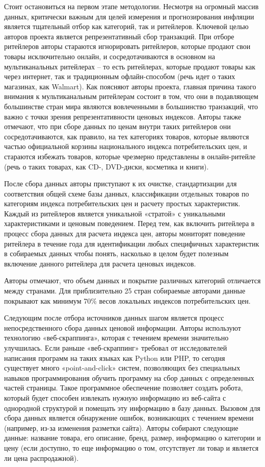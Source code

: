 Стоит остановиться на первом этапе методологии. Несмотря на огромный массив данных, критически важным для целей измерения и прогнозирования инфляции является тщательный отбор как категорий, так и ритейлеров. Ключевой целью авторов проекта является репрезентативный сбор транзакций. При отборе ритейлеров авторы стараются игнорировать ритейлеров, которые продают свои товары исключительно онлайн, и сосредотачиваются в основном на мультиканальных ритейлерах – то есть ритейлерах, которые продают товары как через интернет, так и традиционным офлайн-способом (речь идет о таких магазинах, как Walmart). Как поясняют авторы проекта, главная причина такого внимания к мультиканальным ритейлерам состоит в том, что они в подавляющем большинстве стран мира являются вовлеченными в большинство транзакций, что важно с точки зрения репрезентативности ценовых индексов. Авторы также отмечают, что при сборе данных по ценам внутри таких ритейлеров они сосредотачиваются, как правило, на тех категориях товаров, которые являются частью официальной корзины национального индекса потребительских цен, и стараются избежать товаров, которые чрезмерно представлены в онлайн-ритейле (речь о таких товарах, как CD-, DVD-диски, косметика и книги).

После сбора данных авторы приступают к их очистке, стандартизации для соответствия общей схеме базы данных, классификации отдельных товаров по категориям индекса потребительских цен и расчету простых характеристик. Каждый из ритейлеров является уникальной «стратой» с уникальными характеристиками и ценовым поведением. Перед тем, как включить ритейлера в процесс сбора данных для расчета индекса цен, авторы мониторят поведение ритейлера в течение года для идентификации любых специфичных характеристик в собираемых данных чтобы понять, насколько в целом будет полезным включение данного ритейлера для расчета ценовых индексов.

Авторы отмечают, что объем данных и покрытие различных категорий отличается между странами. Для приблизительно 25 стран собираемые авторами данные покрывают как минимум 70\% весов локальных индексов потребительских цен.

Следующим после отбора источников данных шагом является процесс непосредственного сбора данных ценовой информации. Авторы используют технологию «веб-скраппинга», которая с течением времени значительно улучшилась. Если раньше «веб-скраппинг» требовал от исследователей написания программ на таких языках как Python или PHP, то сегодня существует много «point-and-click» систем, позволяющих без специальных навыков программирования обучить программу на сбор данных с определенных частей страницы. Такое программное обеспечение позволяет создать робота, который будет способен извлекать нужную информацию из веб-сайта с однородной структурой и помещать эту информацию в базу данных. Вызовом для сбора данных является обнаружение ошибок, возникающих с течением времени (например, из-за изменения разметки сайта). Авторы собирают следующие данные: название товара, его описание, бренд, размер, информацию о категории и цену (если доступно, то еще информацию о том, отсутствует ли товар и является ли цена распродажной).

